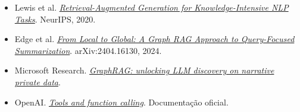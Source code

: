 \begingroup\small
\begin{itemize}
\item Lewis et al. \href{https://arxiv.org/abs/2005.11401}{\emph{Retrieval-Augmented Generation for Knowledge-Intensive NLP Tasks}}. NeurIPS, 2020.
\item Edge et al. \href{https://arxiv.org/abs/2404.16130}{\emph{From Local to Global: A Graph RAG Approach to Query-Focused Summarization}}. arXiv:2404.16130, 2024.
\item Microsoft Research. \href{https://www.microsoft.com/en-us/research/project/graphrag/}{\emph{GraphRAG: unlocking LLM discovery on narrative private data}}.
\item OpenAI. \href{https://developers.openai.com/api/docs/guides/tools}{\emph{Tools and function calling}}. Documentação oficial.
\end{itemize}
\endgroup
